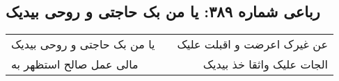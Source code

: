 \begin{center}
\section*{رباعی شماره ۳۸۹: یا من بک حاجتی و روحی بیدیک}
\label{sec:sh389}
\begin{longtable}{l p{0.5cm} r}
یا من بک حاجتی و روحی بیدیک
&&
عن غیرک اعرضت و اقبلت علیک
\\
مالی عمل صالح استظهر به
&&
الجات علیک واثقا خذ بیدیک
\\
\end{longtable}
\end{center}
